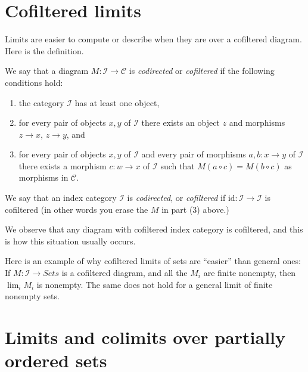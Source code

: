 \section{Cofiltered limits}
\label{section-codirected-limits}

\noindent
Limits are easier to compute or describe when they
are over a cofiltered diagram. Here is the definition.

\begin{definition}
\label{definition-codirected}
We say that a diagram $M : \mathcal{I} \to \mathcal{C}$ is {\it codirected}
or {\it cofiltered} if the following conditions hold:
\begin{enumerate}
\item the category $\mathcal{I}$ has at least one object,
\item for every pair of objects $x, y$ of $\mathcal{I}$
there exists an object $z$ and morphisms $z \to x$,
$z \to y$, and
\item for every pair of objects $x, y$ of $\mathcal{I}$
and every pair of morphisms $a, b : x \to y$ of $\mathcal{I}$
there exists a morphism $c : w \to x$ of $\mathcal{I}$
such that $M(a \circ c) = M(b \circ c)$ as morphisms in $\mathcal{C}$.
\end{enumerate}
We say that an index category $\mathcal{I}$ is {\it codirected}, or
{\it cofiltered} if $\text{id} : \mathcal{I} \to \mathcal{I}$ is
cofiltered (in other words you erase the $M$ in part (3) above.)
\end{definition}

\noindent
We observe that any diagram with cofiltered index category is cofiltered,
and this is how this situation usually occurs.

\medskip\noindent
Here is an example of why cofiltered limits of sets are ``easier'' than
general ones: If $M : \mathcal{I} \to \textit{Sets}$ is a cofiltered diagram,
and all the $M_i$ are finite nonempty, then $\lim_i M_i$ is nonempty.
The same does not hold for a general limit of finite nonempty sets.











\section{Limits and colimits over partially ordered sets}
\label{section-posets-limits}

